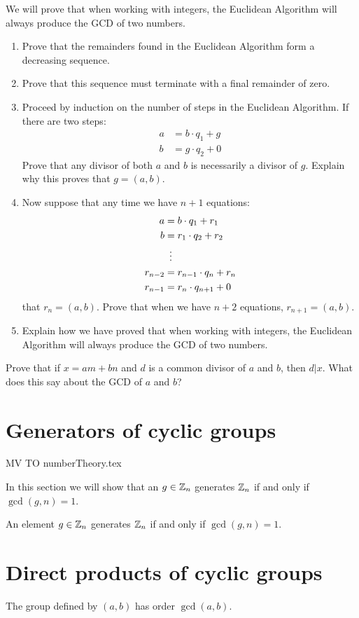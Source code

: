 \documentclass{ximera}
\begin{document}
\begin{exercise} 
We will prove that when working with integers, the Euclidean Algorithm
will always produce the GCD of two numbers.
\begin{enumerate}
\item Prove that the remainders found in the Euclidean Algorithm form a
  decreasing sequence.
\item Prove that this sequence must terminate with a final remainder
  of zero.
\item Proceed by induction on the number of steps in the Euclidean
  Algorithm. If there are two steps:
\begin{align*}
a &= b\cdot q_1 + g \\
b &= g\cdot q_2 +0
\end{align*}
Prove that any divisor of both $a$ and $b$ is necessarily a divisor
of $g$. Explain why this proves that $g = (a,b)$.
\item Now suppose that any time we have $n+1$ equations:
\begin{align*}
a &= b\cdot q_1 + r_1 \\
b &= r_1\cdot q_2 + r_2 \\
  &\hspace{.5em}\vdots\\
r_{n-2} &= r_{n-1}\cdot q_{n} + r_n\\
r_{n-1} &= r_{n}\cdot q_{n+1} + 0
\end{align*}
that $r_n = (a,b)$. Prove that when we have $n+2$ equations, $r_{n+1}
= (a,b)$.
\item Explain how we have proved that when working with integers, the
  Euclidean Algorithm will always produce the GCD of two numbers.
\end{enumerate}
\end{exercise}


\begin{exercise} 
Prove that if $x = am +bn$ and $d$ is a common divisor of $a$ and $b$,
then $d|x$. What does this say about the GCD of $a$ and $b$?
\end{exercise}



\section{Generators of cyclic groups}


MV TO numberTheory.tex




In this section we will show that an $g\in \mathbb Z_n$ generates $\mathbb Z_n$ if
and only if $\gcd(g,n) = 1$.




\begin{theorem}
  An element $g\in \mathbb Z_n$ generates $\mathbb Z_n$ if and only if $\gcd(g,n) =
  1$.
\end{theorem}










\section{Direct products of cyclic groups}

The group defined by $(a,b)$ has order $\gcd(a,b)$.
\end{document}
